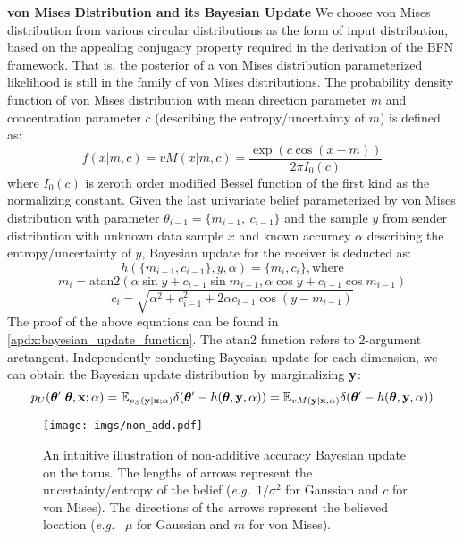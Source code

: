 \textbf{von Mises Distribution and its Bayesian Update} We choose von Mises distribution \citep{mardia2009directional} from various circular distributions as the form of input distribution, based on the appealing conjugacy property required in the derivation of the BFN framework.
That is, the posterior of a von Mises distribution parameterized likelihood is still in the family of von Mises distributions. The probability density function of von Mises distribution with mean direction parameter $m$ and concentration parameter $c$ (describing the entropy/uncertainty of $m$) is defined as: 
\begin{equation}
f(x|m,c)=vM(x|m,c)=\frac{\exp(c\cos(x-m))}{2\pi I_0(c)}
\end{equation}
where $I_0(c)$ is zeroth order modified Bessel function of the first kind as the normalizing constant. Given the last univariate belief parameterized by von Mises distribution with parameter $\theta_{i-1}=\{m_{i-1},\ c_{i-1}\}$ and the sample $y$ from sender distribution with unknown data sample $x$ and known accuracy $\alpha$ describing the entropy/uncertainty of $y$,  Bayesian update for the receiver is deducted as:
\begin{equation}
 h(\{m_{i-1},c_{i-1}\},y,\alpha)=\{m_i,c_i \}, \text{where}
\end{equation}
\begin{equation}\label{eq:h_m}
m_i=\text{atan2}(\alpha\sin y+c_{i-1}\sin m_{i-1}, {\alpha\cos y+c_{i-1}\cos m_{i-1}})
\end{equation}
\begin{equation}\label{eq:h_c}
c_i =\sqrt{\alpha^2+c_{i-1}^2+2\alpha c_{i-1}\cos(y-m_{i-1})}
\end{equation}
The proof of the above equations can be found in \cref{apdx:bayesian_update_function}. The atan2 function refers to  2-argument arctangent. Independently conducting  Bayesian update for each dimension, we can obtain the Bayesian update distribution by marginalizing $\operatorname{\mathbf{y}}$:
\begin{equation}
p_U({\bm{\theta}}'|{\bm{\theta}},\bold{x};\alpha)=\mathbb{E}_{p_S(\bold{y}|\bold{x};\alpha)}\delta({\bm{\theta}}'-h({\bm{\theta}},\bold{y},\alpha))=\mathbb{E}_{vM(\bold{y}|\bold{x},\alpha)}\delta({\bm{\theta}}'-h({\bm{\theta}},\bold{y},\alpha))
\end{equation} 
\begin{figure}
    \centering
    \vskip -0.15in
    \texttt{[image: imgs/non\_add.pdf]}
    \caption{An intuitive illustration of non-additive accuracy Bayesian update on the torus. The lengths of arrows represent the uncertainty/entropy of the belief (\emph{e.g.}~$1/\sigma^2$ for Gaussian and $c$ for von Mises). The directions of the arrows represent the believed location (\emph{e.g.}~ $\mu$ for Gaussian and $m$ for von Mises).}
    \label{fig:non_add}
    \vskip -0.15in
\end{figure}
